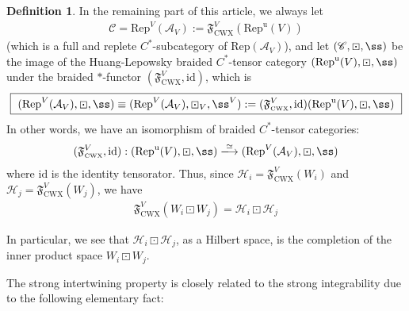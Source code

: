 \documentclass[11pt,b5paper,notitlepage]{article}
\theoremstyle{definition}
\newtheorem{df}{Definition}[section]
\theoremstyle{plain}
\newcommand{\fk}{\mathfrak}
\newcommand{\mc}{\mathcal}
\newcommand{\id}{\mathrm{id}}
\newcommand{\Rep}{\mathrm{Rep}}
\newcommand{\uni}{\mathrm{u}}
\newcommand{\scr}{\mathscr}
\newcommand{\RepV}{{\mathrm{Rep}^\uni(V)}}
\newcommand{\CWX}{{\scriptscriptstyle \mathrm{CWX}}}
\numberwithin{equation}{section}
\begin{document}
\begin{df}\label{lb44}
In the remaining part of this article, we always let 
\begin{align}\label{eq105}
\scr C=\Rep^V(\mc A_V):=\fk F^V_\CWX(\RepV)
\end{align}
(which is a full and replete $C^*$-subcategory of $\Rep(\mc A_V)$), and let $(\scr C,\boxdot,\ss)$ be the image of the Huang-Lepowsky braided $C^*$-tensor category $(\RepV,\boxdot,\ss)$ under the braided $*$-functor $(\fk F^V_\CWX,\id)$, which is
\begin{align}
\boxed{~(\Rep^V(\mc A_V),\boxdot,\ss)\equiv (\Rep^V(\mc A_V),\boxdot_V,\ss^V):=(\fk F^V_\CWX,\id)(\RepV,\boxdot,\ss)~}
\end{align}
In other words, we have an isomorphism of braided $C^*$-tensor categories:
\begin{align}
(\fk F^V_\CWX,\id):(\RepV,\boxdot,\ss)\xlongrightarrow{\simeq} (\Rep^V(\mc A_V),\boxdot,\ss)
\end{align}
where $\id$ is the identity tensorator. Thus, since $\mc H_i=\fk F_\CWX^V(W_i)$ and $\mc H_j=\fk F_\CWX^V(W_j)$, we have
\begin{align}
\fk F_\CWX^V(W_i\boxdot W_j)=\mc H_i\boxdot\mc H_j
\end{align}
\end{df}

In particular, we see that $\mc H_i\boxdot\mc H_j$, as a Hilbert space, is the completion of the inner product space $W_i\boxdot W_j$.


The strong intertwining property is closely related to the strong integrability due to the following elementary fact:
\end{document}
